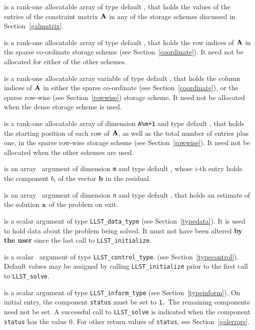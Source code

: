 \documentclass{galahad}
\newcommand{\packagename}{LLST}
\begin{document}
\begin{description}
\begin{description}
 is a rank-one allocatable array of type default \realdp, that holds
the values of the entries of the constraint matrix ${\mathbf{A}}$ in any of the
storage schemes discussed in Section~\ref{galmatrix}.

 is a rank-one allocatable array of type default \integer,
that holds the row indices of ${\mathbf{A}}$ in the sparse co-ordinate storage
scheme (see Section~\ref{coordinate}).
It need not be allocated for either of the other schemes.

 is a rank-one allocatable array variable of type default \integer,
that holds the column indices of ${\mathbf{A}}$ in either the sparse co-ordinate
(see Section~\ref{coordinate}), or the sparse row-wise
(see Section~\ref{rowwise}) storage scheme.
It need not be allocated when the dense storage scheme is used.

 is a rank-one allocatable array of dimension {\tt A\%m+1} and type
default \integer, that holds the starting position of
each row of ${\mathbf{A}}$, as well
as the total number of entries plus one, in the sparse row-wise storage
scheme (see Section~\ref{rowwise}). It need not be allocated when the
other schemes are used.
\end{description}

 is an array \intentin\ argument of dimension {\tt m} and
type default \realdp,  whose $i$-th entry holds the component $b_i$ of
the vector ${\mathbf{b}}$ in the residual.

 is an array \intentout\ argument of dimension {\tt n} and
type default \realdp, that holds an estimate of the solution ${\mathbf{x}}$
of the problem on exit.

 is a scalar \intentinout argument of type
{\tt \packagename\_data\_type}
(see Section~\ref{typedata}). It is used to hold data about the problem being
solved. It must not have been altered {\bf by the user} since the last call to
{\tt \packagename\_initialize}.

 is a scalar \intentin\ argument of type
{\tt \packagename\_control\_type}.
(see Section~\ref{typecontrol}).
Default values may be assigned by calling {\tt \packagename\_initialize}
prior to the first call to {\tt \packagename\_solve}.

 is a scalar \intentinout argument of type
{\tt \packagename\_inform\_type}
(see Section~\ref{typeinform}).
On initial entry, the component {\tt status} must be set to {\tt 1.}
The remaining components need not be set.
A successful call to
{\tt \packagename\_solve}
is indicated when the  component {\tt status} has the value 0.
For other return values of {\tt status}, see Section~\ref{galerrors}.


\end{description}
\end{document}
